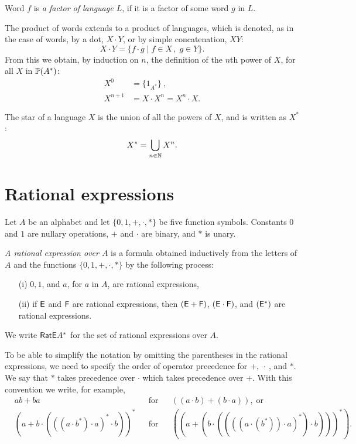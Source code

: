 Word $f$ is \emph{a factor of language $L$}, if it is a factor of some word $g$ in $L$.

The product of words extends to a product of languages, which is denoted, as in the case of words, by a dot, $X \cdot Y$, or by simple concatenation, $X Y$:
\[
    X \cdot Y = \{ f \cdot g \mid f \in X \, , \; g \in Y \}.
\]
From this we obtain, by induction on $n$, the definition of the $n$th power of $X$, for all $X$ in $\mathbb{P}(A^*)$:
\begin{align*}
    X^0 &= \{1_{A^*}\} \: ,\\
    X^{n+1} &= X \cdot X^n = X^n \cdot X.
\end{align*}

The star of a language $X$ is the union of all the powers of $X$, and is written as $X^*$:
\[
    X^* = \bigcup_{n \in \mathbb{N}} X^n.
\]

\section{Rational expressions}

Let $A$ be an alphabet and let $\{0, 1, +, \cdot, *\}$ be five function symbols. Constants $0$ and $1$ are nullary operations, $+$ and $\cdot$ are binary, and $*$ is unary.

\begin{defn}
    \emph{A rational expression over $A$} is a formula obtained inductively from the letters of $A$ and the functions $\{0, 1, +, \cdot, *\}$ by the following process:
    \begin{itemize}
        \item[(i)] $0, 1$, and $a$, for $a$ in $A$, are rational expressions,
        \item[(ii)] if ${\mathsf{E}}$ and ${\mathsf{F}}$ are rational expressions, then $({\mathsf{E}} + {\mathsf{F}})$, $({\mathsf{E}} \cdot {\mathsf{F}})$, and $({\mathsf{E}}^*)$ are rational expressions.
    \end{itemize}
    We write ${\mathsf{RatE}} A^*$ for the set of rational expressions over $A$.
\end{defn}

To be able to simplify the notation by omitting the parentheses in the rational expressions, we need to specify the order of operator precedence for $+, \: \cdot \:$, and $*$. We say that $*$ takes precedence over $\cdot$ which takes precedence over $+$. With this convention we write, for example,
\begin{align*}
    &ab + ba & &\text{for} & &((a \cdot b) + (b \cdot a)), \; \text{or}\\
    &{(a + b \cdot ({((a \cdot b^* ) \cdot a)}^* \cdot b))}^* & &\text{for} & &({(a + (b \cdot (({((a \cdot (b^*)) \cdot a)}^* ) \cdot b)))}^* ) .
\end{align*}

